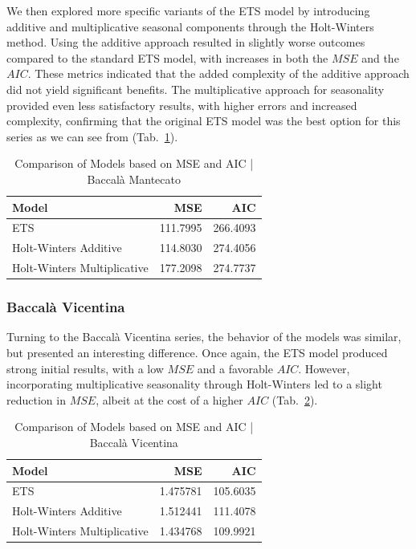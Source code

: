 \documentclass[10pt,twocolumn,letterpaper]{article}
\begin{document}
We then explored more specific variants of the ETS model by introducing additive and multiplicative seasonal components through the Holt-Winters method. Using the additive approach resulted in slightly worse outcomes compared to the standard ETS model, with increases in both the $MSE$ and the $AIC$. These metrics indicated that the added complexity of the additive approach did not yield significant benefits. The multiplicative approach for seasonality provided even less satisfactory results, with higher errors and increased complexity, confirming that the original ETS model was the best option for this series as we can see from (Tab.~\ref{table:model_comparison_man}).

\begin{table}[h!]
\centering
\begin{tabular}{|l|r|r|}
\hline
\textbf{Model} & \textbf{MSE} & \textbf{AIC} \\
\hline
ETS & 111.7995 & 266.4093 \\
Holt-Winters Additive & 114.8030 & 274.4056 \\
Holt-Winters Multiplicative & 177.2098 & 274.7737 \\
\hline
\end{tabular}
\caption{Comparison of Models based on MSE and AIC | Baccalà Mantecato}
\label{table:model_comparison_man}
\end{table}

\subsubsection{Baccalà Vicentina}
Turning to the Baccalà Vicentina series, the behavior of the models was similar, but presented an interesting difference. Once again, the ETS model produced strong initial results, with a low $MSE$ and a favorable $AIC$. However, incorporating multiplicative seasonality through Holt-Winters led to a slight reduction in $MSE$, albeit at the cost of a higher $AIC$ (Tab.~\ref{table:model_comparison_vic}).

\begin{table}[h!]
\centering
\begin{tabular}{|l|r|r|}
\hline
\textbf{Model} & \textbf{MSE} & \textbf{AIC} \\
\hline
ETS & 1.475781 & 105.6035 \\
Holt-Winters Additive & 1.512441 & 111.4078 \\
Holt-Winters Multiplicative & 1.434768 & 109.9921 \\
\hline
\end{tabular}
\caption{Comparison of Models based on MSE and AIC | Baccalà Vicentina}
\label{table:model_comparison_vic}
\end{table}
\end{document}
